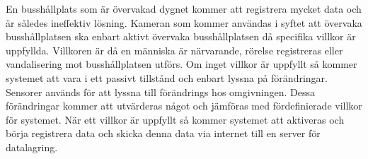 En busshållplats som är övervakad dygnet kommer att registrera mycket data och är således ineffektiv lösning. Kameran som kommer användas i syftet att övervaka busshållplatsen ska enbart aktivt övervaka busshållplatsen då specifika villkor är uppfyllda. Villkoren är då en människa är närvarande, rörelse registreras eller vandalisering mot busshållplatsen utförs. Om inget villkor är uppfyllt så kommer systemet att vara i ett passivt tillstånd och enbart lyssna på förändringar.\\

Sensorer används för att lyssna till förändrings hos omgivningen. Dessa förändringar kommer att utvärderas något och jämföras med fördefinierade villkor för systemet. När ett villkor är uppfyllt så kommer systemet att aktiveras och börja registrera data och skicka denna data via internet till en server för datalagring.\\


